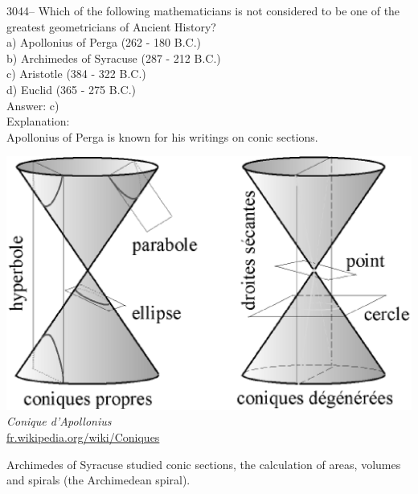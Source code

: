\documentclass[letterpaper, 12pt]{article}
\begin{document}
3044-- Which of the following mathematicians is not considered to be one of the greatest geometricians of Ancient History?\\

a) Apollonius of Perga (262 - 180 B.C.)\\
b) Archimedes of Syracuse (287 - 212 B.C.)\\
c) Aristotle (384 - 322 B.C.)\\
d) Euclid (365 - 275 B.C.)\\

Answer: c)\\

Explanation:\\
Apollonius of Perga is known for his writings on conic sections.\\
\begin{center}
\includegraphics[scale=0.25]{Coniques.eps}\\
\emph{{\small Conique d'Apollonius}}\\
\href{http://fr.wikipedia.org/wiki/Coniques}{fr.wikipedia.org/wiki/Coniques}\\
\end{center}
Archimedes of Syracuse studied conic sections, the calculation of areas, volumes and spirals (the Archimedean spiral).\\
\end{document}
